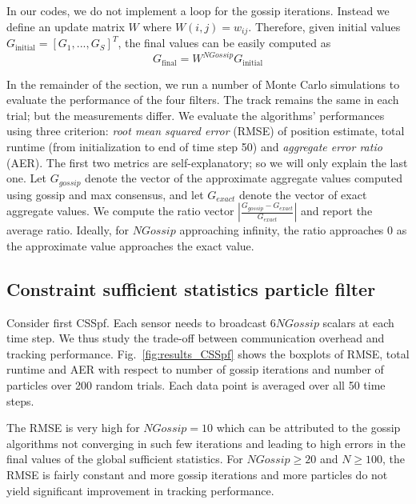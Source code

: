 \documentclass[10pt,letterpaper,final]{article}
\begin{document}
In our codes, we do not implement a loop for the gossip iterations. Instead we define an update matrix $W$ where $W(i,j)=w_{ij}$. Therefore, given initial values $G_{\text{initial}}=[G_1,...,G_S]^T$, the final values can be easily computed as 
\begin{equation}
G_{\text{final}} = W^{NGossip}G_{\text{initial}}
\end{equation}


In the remainder of the section, we run a number of Monte Carlo simulations to evaluate the performance of the four filters. The track remains the same in each trial; but the measurements differ. We evaluate the algorithms' performances using three criterion: \textit{root mean squared error} (RMSE) of position estimate, total runtime (from initialization to end of time step 50) and \textit{aggregate error ratio} (AER). The first two metrics are self-explanatory; so we will only explain the last one. Let $G_{gossip}$ denote the vector of the approximate aggregate values computed using gossip and max consensus, and let $G_{exact}$ denote the vector of exact aggregate values. We compute the ratio vector $|\frac{G_{gossip}-G_{exact}}{G_{exact}}|$ and report the average ratio. Ideally, for $NGossip$ approaching infinity, the ratio approaches 0 as the approximate value approaches the exact value. 

\subsection{Constraint sufficient statistics particle filter}
Consider first CSSpf. Each sensor needs to broadcast $6NGossip$ scalars at each time step. We thus study the trade-off between communication overhead and tracking performance. Fig.~\ref{fig:results_CSSpf} shows the boxplots of RMSE, total runtime and AER with respect to number of gossip iterations and number of particles over 200 random trials. Each data point is averaged over all 50 time steps. 

The RMSE is very high for $NGossip=10$ which can be attributed to the gossip algorithms not converging in such few iterations and leading to high errors in the final values of the global sufficient statistics. For $NGossip\geq 20$ and $N\geq 100$, the RMSE is fairly constant and more gossip iterations and more particles do not yield significant improvement in tracking performance. 
\end{document}
